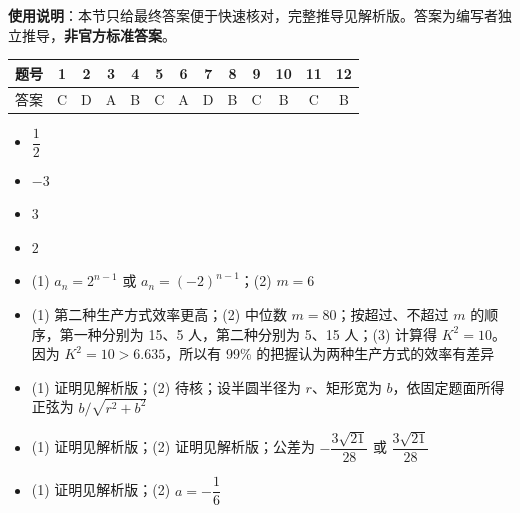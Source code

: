 
\begin{gknotice}
\textbf{使用说明}：本节只给最终答案便于快速核对，完整推导见解析版。答案为编写者独立推导，\textbf{非官方标准答案}。
\end{gknotice}

\begin{center}\begin{tabular}{ccccccccccccc}
\toprule
题号 & 1 & 2 & 3 & 4 & 5 & 6 & 7 & 8 & 9 & 10 & 11 & 12 \\
\midrule
答案 & C & D & A & B & C & A & D & B & C & B & C & B \\
\bottomrule
\end{tabular}\end{center}

\begin{itemize}[leftmargin=2.6em]
  \item[\textbf{13.}] $\dfrac12$
  \item[\textbf{14.}] $-3$
  \item[\textbf{15.}] $3$
  \item[\textbf{16.}] $2$
\end{itemize}

\begin{itemize}[leftmargin=2.6em]
  \item[\textbf{17.}] (1) $a_n = 2^{n-1}$ 或 $a_n = (-2)^{n-1}$；(2) $m = 6$
  \item[\textbf{18.}] (1) 第二种生产方式效率更高；(2) 中位数 $m=80$；按超过、不超过 $m$ 的顺序，第一种分别为 15、5 人，第二种分别为 5、15 人；(3) 计算得 $K^2 = 10$。因为 $K^2 = 10 > 6.635$，所以有 99\% 的把握认为两种生产方式的效率有差异
  \item[\textbf{19.}] (1) 证明见解析版；(2) 待核；设半圆半径为 $r$、矩形宽为 $b$，依固定题面所得正弦为 $b/\sqrt{r^2+b^2}$
  \item[\textbf{20.}] (1) 证明见解析版；(2) 证明见解析版；公差为 $-\dfrac{3\sqrt{21}}{28}$ 或 $\dfrac{3\sqrt{21}}{28}$
  \item[\textbf{21.}] (1) 证明见解析版；(2) $a = -\dfrac16$
\end{itemize}

